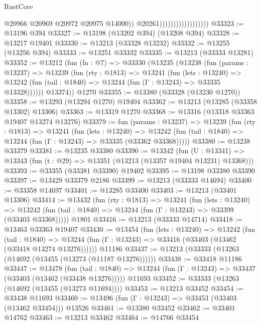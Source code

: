 \begin{lexlean}{RustCore}
\begin{coremodule}
                                            @20966
                                            @20969
                                            @20972
                                            @20975
                                            @14000))
                                        @20261))))))))))))))))))
@33323 := @13196 @394
@33327 := @13198 (@13202 @394) (@13208 @394)
@33328 := @13217 @19401
@33330 := @13213 (@33328 @13232)
@33332 := @13255 (@13256 @394)
@33333 := @13251 @33332
@33335 := @13213 (@33333 @13281)
@33352 := @13212
    (fun (fn : @7) =>
    @33330
      (@13235
        (@13238
          (fun (params : @13237) =>
          @13239
            (fun (rty : @1813) =>
            @13241
              (fun (lets : @13240) =>
              @13242 (fun (tail : @1840) => @13244 (fun (Γ : @13243) => @33335 @13328))))))
        @13374))
    @1270
@33355 := @13380 (@33328 (@13230 @1270))
@33358 := @13293 (@13294 @1270) @19404
@33362 := @13213 (@13285 (@33358 @13302) @13306)
@33363 := @13319 @1270
@33368 := @13316 (@13318 @33363 @19407 @13274 @13276)
@33379 := fun (params : @13237) =>
  @13239
    (fun (rty : @1813) =>
    @13241
      (fun (lets : @13240) =>
      @13242 (fun (tail : @1840) => @13244 (fun (Γ : @13243) => @33335 (@33362 @33368)))))
@33380 := @13238 @33379
@33381 := @13235 @33380
@33390 := @13342
    (fun (U : @13341) => @13343 (fun (t : @29) => @13351 (@13213 (@13357 @19404 @13231) @13368)))
@33393 := @33355 (@33381 @33390) @19402
@33395 := @13198 @33380 @33390
@33397 := @13429 @33379 @2186
@33399 := @13213 (@33333 @14694)
@33400 := @33358 @14697
@33401 := @13285 @33400
@33403 := @13213 (@33401 @13306)
@33414 := @13432
    (fun (rty : @1813) =>
    @13241
      (fun (lets : @13240) =>
      @13242 (fun (tail : @1840) => @13244 (fun (Γ : @13243) => @33399 (@33403 @33368)))))
    @1801
@33416 := @13213 (@33333 @14714)
@33418 := @13463 @33363 @19407
@33430 := @13454
    (fun (lets : @13240) =>
    @13242
      (fun (tail : @1840) =>
      @13244 (fun (Γ : @13243) => @33416 (@33403 (@13462 (@33418 @13274 @13276))))))
    @11186
@33437 := @13213 (@33333 (@13263 (@14692 (@13455 (@13273 (@11187 @13276))))))
@33438 := @33418 @11186
@33447 := @13478
    (fun (tail : @1840) => @13244 (fun (Γ : @13243) => @33437 (@33403 (@13462 (@33438 @13276)))))
    @11693
@33452 := @33333 (@13263 (@14692 (@13455 (@13273 @11694))))
@33453 := @13213 @33452
@33454 := @33438 @11693
@33460 := @13496 (fun (Γ : @13243) => @33453 (@33403 (@13462 @33454))) @13526
@33461 := @13380 @33452
@33462 := @33401 @14762
@33463 := @13213 @33462
@33464 := @14766 @33454

\end{coremodule}
\end{lexlean}

